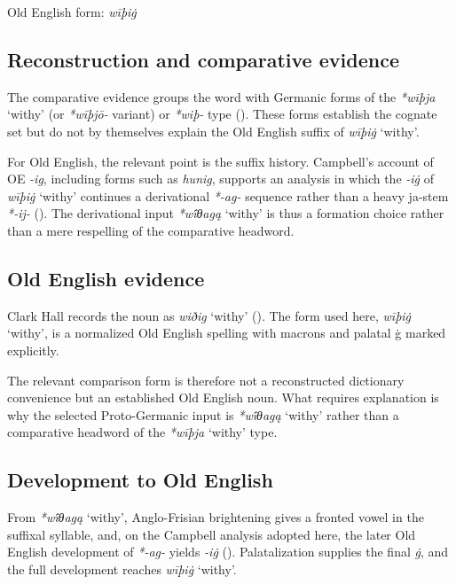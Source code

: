 \documentclass[
  british,
  a4paper,
  openany]{book}
\providecommand{\Recon}[1]{\emph{*#1}}
{\catcode`→=\active \global\def→{\ensuremath{\rightarrow}}}
\providecommand{\Recon}[1]{\emph{*#1}}
{\catcode`→=\active \global\def→{\ensuremath{\rightarrow}}}
\begin{document}
Old English form: \emph{wīþiġ}

\subsection{Reconstruction and comparative
evidence}\label{reconstruction-and-comparative-evidence-105}

The comparative evidence groups the word with Germanic forms of the
\Recon{wīþja} `withy' (or \emph{*wīþjō-} variant) or \emph{*wiþ-} type
(). These forms establish the
cognate set but do not by themselves explain the Old English suffix of
\emph{wīþiġ} `withy'.

For Old English, the relevant point is the suffix history. Campbell's
account of OE \emph{-ig}, including forms such as \emph{hunig}, supports
an analysis in which the \emph{-iġ} of \emph{wīþiġ} `withy' continues a
derivational \emph{*-ag-} sequence rather than a heavy ja-stem
\emph{*-ij-} (). The derivational input {\Recon{wī́θagą} `withy'} is thus a
formation choice rather than a mere respelling of the comparative
headword.

\subsection{Old English evidence}\label{old-english-evidence-105}

Clark Hall records the noun as {\emph{wiðig}} `withy'
(). The form used
here, {\emph{wīþiġ}} `withy', is a normalized Old English spelling with
macrons and palatal ġ marked explicitly.

The relevant comparison form is therefore not a reconstructed dictionary
convenience but an established Old English noun. What requires
explanation is why the selected Proto-Germanic input is {\Recon{wī́θagą}
`withy'} rather than a comparative headword of the \Recon{wīþja} `withy'
type.

\subsection{Development to Old
English}\label{development-to-old-english-105}

From {\Recon{wī́θagą} `withy'}, Anglo-Frisian brightening gives a fronted
vowel in the suffixal syllable, and, on the Campbell analysis adopted
here, the later Old English development of \emph{*-ag-} yields
\emph{-iġ} ().
Palatalization supplies the final \emph{ġ}, and the full development
reaches {\emph{wīþiġ}} `withy'.
\end{document}
